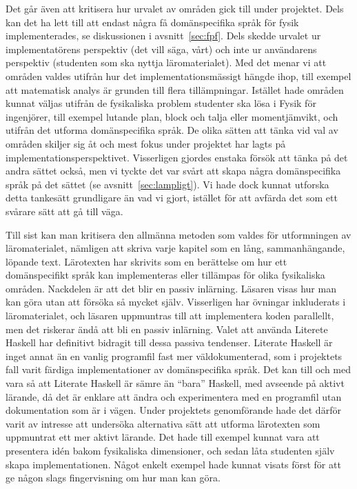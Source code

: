 Det går även att kritisera hur urvalet av områden gick till under projektet.
Dels kan det ha lett till att endast några få domänspecifika språk för fysik
implementerades, se diskussionen i avsnitt~\ref{sec:fpf}. Dels skedde urvalet ur
implementatörens perspektiv (det vill säga, vårt) och inte ur användarens
perspektiv (studenten som ska nyttja läromaterialet). Med det menar vi att
områden valdes utifrån hur det implementationsmässigt hängde ihop, till exempel
att matematisk analys är grunden till flera tillämpningar. Istället hade områden
kunnat väljas utifrån de fysikaliska problem studenter ska lösa i Fysik för
ingenjörer, till exempel lutande plan, block och talja eller momentjämvikt, och
utifrån det utforma domänspecifika språk. De olika sätten att tänka vid val av
områden skiljer sig åt och mest fokus under projektet har lagts på
implementationsperspektivet. Visserligen gjordes enstaka försök att tänka på det
andra sättet också, men vi tyckte det var svårt att skapa några domänspecifika
språk på det sättet (se avsnitt~\ref{sec:lampligt}). Vi hade dock kunnat utforska
detta tankesätt grundligare än vad vi gjort, istället för att avfärda det som
ett svårare sätt att gå till väga.

Till sist kan man kritisera den allmänna metoden som valdes för utformningen av
läromaterialet, nämligen att skriva varje kapitel som en lång, sammanhängande,
löpande text. Lärotexten har skrivits som en berättelse om hur ett
domänspecifikt språk kan implementeras eller tillämpas för olika fysikaliska
områden. Nackdelen är att det blir en passiv inlärning. Läsaren visas hur man
kan göra utan att försöka så mycket själv. Visserligen har övningar inkluderats
i läromaterialet, och läsaren uppmuntras till att implementera koden parallellt, men det
riskerar ändå att bli en passiv inlärning. Valet att använda Literete
Haskell har definitivt bidragit till dessa passiva tendenser. Literate Haskell är
inget annat än en vanlig programfil fast mer väldokumenterad, som i projektets fall varit färdiga implementationer av domänspecifika språk. Det kan till och med vara så att Literate
Haskell är sämre än ``bara'' Haskell, med avseende på aktivt lärande, då det är
enklare att ändra och experimentera med en programfil utan dokumentation som är i vägen. Under
projektets genomförande hade det därför varit av intresse att undersöka
alternativa sätt att utforma lärotexten som uppmuntrat ett mer aktivt lärande.
Det hade till exempel kunnat vara att presentera idén bakom fysikaliska
dimensioner, och sedan låta studenten själv skapa implementationen. Något enkelt
exempel hade kunnat visats först för att ge någon slags fingervisning om hur man
kan göra.

